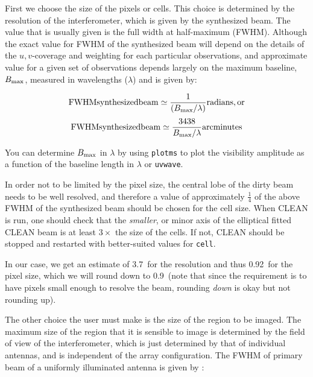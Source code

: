 \documentclass[force,almostfull,justified]{tufte-book}
\begin{document}
First we choose the size of the pixels or cells.  This choice is determined by the resolution of the
interferometer, which is given by the synthesized beam.  The value that is usually given is the full
width at half-maximum (FWHM).  Although the exact value for FWHM of the synthesized beam will depend
on the details of the $u,v$-coverage and weighting for each particular observations, and approximate
value for a given set of observations depends largely on the maximum baseline, $B_{\rm max}$, measured
in wavelengths ($\lambda$) and is given by:

\begin{equation}
{\rm FWHM synthesized beam} \simeq \frac{1}{(B_{\rm max}/\lambda)} {\rm radians, or}
\end{equation}
\begin{equation}
{\rm FWHM synthesized beam} \simeq \frac{3438}{B_{\rm max}/\lambda} {\rm arcminutes}
\end{equation}

You can determine $B_{\rm max}$ in $\lambda$ by using {\tt plotms} to plot the visibility amplitude as
a function of the baseline length in $\lambda$ or {\tt uvwave}.

In order not to be limited by the pixel size, the central lobe of the dirty beam needs to be well
resolved, and therefore a value of approximately $\frac{1}{4}$ of the above FWHM of the synthesized
beam should be chosen for the cell size.  When CLEAN is run, one should check that the {\em smaller},
or minor axis of the elliptical fitted CLEAN beam is at least $3\times$ the size of the cells.  If
not, CLEAN should be stopped and restarted with better-suited values for {\tt cell}.

In our case, we get an estimate of 3.7\arcmin\ for the resolution and thus 0.92\arcmin\ for the pixel
size, which we will round down to 0.9\arcmin\ (note that since the requirement is to have pixels small
enough to resolve the beam, rounding {\em down} is okay but not rounding up).

The other choice the user must make is the size of the region to be imaged.  The maximum size of the
region that it is sensible to image is determined by the field of view of the interferometer, which is
just determined by that of individual antennas, and is independent of the array configuration.  The
FWHM of primary beam of a uniformly illuminated antenna is given by \citet{Napier1999}:
%
%   
%
\end{document}
